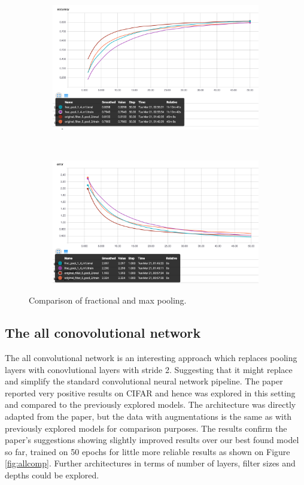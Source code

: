 \documentclass[12pt]{article}
\begin{document}
\begin{figure}[ht!]
    \centering
    \begin{subfigure}[t]{0.475\textwidth}
        \centering
        \includegraphics[width=1.0\linewidth]{disfraca.png}
    \end{subfigure}%
    ~ 
    \begin{subfigure}[t]{0.475\textwidth}
        \centering
        \includegraphics[width=1.0\linewidth]{disfrace.png}
    \end{subfigure}
    \caption{Comparison of fractional and max pooling.}
    \label{fig:fraccomp}
\end{figure}

\subsection{The all conovolutional network}

The all convolutional network\cite{allconv} is an interesting approach which replaces pooling layers with conovlutional layers with stride 2. Suggesting that it might replace and simplify the standard convolutional neural network pipeline\cite{stan}. The paper reported very positive results on CIFAR and hence was explored in this setting and compared to the previously explored models. The architecture was directly adapted from the paper, but the data with augmentations is the same as with previously explored models for comparison purposes. The results confirm the paper's suggestions showing slightly improved results over our best found model so far, trained on 50 epochs for little more reliable results as shown on Figure \ref{fig:allcomp}. Further architectures in terms of number of layers, filter sizes and depths could be explored. 
\end{document}
